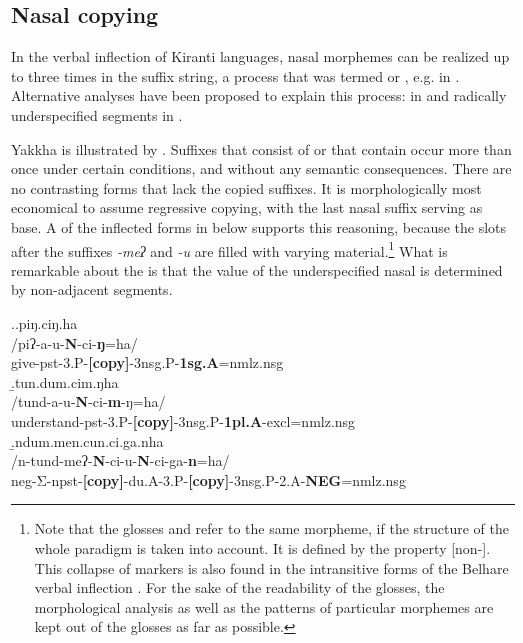 \subsection{Nasal copying}\label{sec-nasalcop}

In the verbal inflection of Kiranti languages, nasal morphemes can be realized up to three times in the suffix string, a process that was termed  or , e.g. in \citet{Driem1987A-grammar, Doornenbal2009A-grammar, Ebert2003Kiranti, Bickel2003Belhare}. Alternative analyses have been proposed to explain this process:  in \citet{Bickeletal2007Free} and radically underspecified segments  in \citet{Zimmermann2012_Affix}. 

Yakkha  is illustrated by \Next. Suffixes that consist of  or that contain  occur more than once under certain conditions, and without any semantic consequences. There are no contrasting forms that lack the copied suffixes. It is  morphologically most economical to assume regressive copying, with the last nasal suffix serving as base. A  of the inflected forms in \Next below supports this reasoning, because the slots after the suffixes \emph{-meʔ} and \emph{-u} are filled with varying material.\footnote{Note that the glosses  and  refer to the same morpheme, if the structure of the whole paradigm is taken into account. It is defined by the property [non-]. This collapse of markers is also found  in the intransitive forms of the Belhare verbal inflection \citep{Bickel1995In-the-vestibule}. For the sake of the readability of the glosses, the morphological analysis as well as the  patterns of particular morphemes are kept out of the glosses as far as possible.} What is remarkable about the  is that the value of the underspecified nasal is determined by non-adjacent segments.


\ex.\a.\glll piŋ.ciŋ.ha\\
		/piʔ-a-u-{\bf N}-ci-{\bf ŋ}=ha/\\
		give{\sc -pst-3.P-{\bf [copy]}-3nsg.P-{\bf 1sg.A}=nmlz.nsg}\\
 	\b.\glll tun.dum.cim.ŋha\\
	/tund-a-u-{\bf N}-ci-{\bf m}-ŋ=ha/\\
	understand{\sc -pst-3.P-{\bf [copy]}-3nsg.P-{\bf 1pl.A}-excl=nmlz.nsg}		\\
	\b.\glll ndum.men.cun.ci.ga.nha\\
	/n-tund-meʔ-{\bf N}-ci-u-{\bf N}-ci-ga-{\bf n}=ha/\\
	{\sc neg-}Σ{\sc -npst-{\bf [copy]}-du.A-3.P-{\bf [copy]}-3nsg.P-2.A-{\bf NEG}=nmlz.nsg}\\

